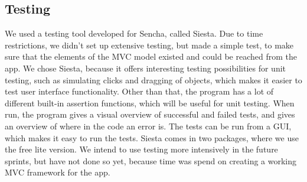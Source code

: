 \subsection{Testing} %
\label{sub:Testing}
We used a testing tool developed for Sencha, called Siesta. Due to time restrictions, we didn't set up extensive testing, but made a simple test, to make sure that the elements of the MVC model existed and could be reached from the app. 
We chose Siesta, because it offers interesting testing possibilities for unit testing, such as simulating clicks and dragging of objects, which makes it easier to test user interface functionality. Other than that, the program has a lot of different built-in assertion functions, which will be useful for unit testing. When run, the program gives a visual overview of successful and failed tests, and gives an overview of where in the code an error is. The tests can be run from a GUI, which makes it easy to run the tests.
Siesta comes in two packages, where we use the free lite version. 
We intend to use testing more intensively in the future sprints, but have not done so yet, because time was spend on creating a working MVC framework for the app. 


 
